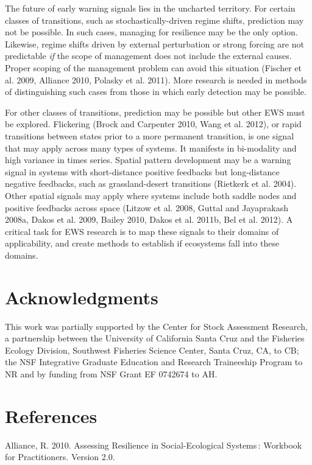 \documentclass{article}
\begin{document}
The future of early warning signals lies in the uncharted territory. For
certain classes of transitions, such as stochastically-driven regime
shifts, prediction may not be possible. In such cases, managing for
resilience may be the only option. Likewise, regime shifts driven by
external perturbation or strong forcing are not predictable \emph{if}
the scope of management does not include the external causes. Proper
scoping of the management problem can avoid this situation (Fischer et
al. 2009, Alliance 2010, Polasky et al. 2011). More research is needed
in methods of distinguishing such cases from those in which early
detection may be possible.

For other classes of transitions, prediction may be possible but other
EWS must be explored. Flickering (Brock and Carpenter 2010, Wang et al.
2012), or rapid transitions between states prior to a more permanent
transition, is one signal that may apply across many types of systems.
It manifests in bi-modality and high variance in times series. Spatial
pattern development may be a warning signal in systems with
short-distance positive feedbacks but long-distance negative feedbacks,
such as grassland-desert transitions (Rietkerk et al. 2004). Other
spatial signals may apply where systems include both saddle nodes and
positive feedbacks across space (Litzow et al. 2008, Guttal and
Jayaprakash 2008a, Dakos et al. 2009, Bailey 2010, Dakos et al. 2011b,
Bel et al. 2012). A critical task for EWS research is to map these
signals to their domains of applicability, and create methods to
establish if ecosystems fall into these domains.

\section{Acknowledgments}

This work was partially supported by the Center for Stock Assessment
Research, a partnership between the University of California Santa Cruz
and the Fisheries Ecology Division, Southwest Fisheries Science Center,
Santa Cruz, CA, to CB; the NSF Integrative Graduate Education and
Research Traineeship Program to NR and by funding from NSF Grant EF
0742674 to AH.

\section{References}

Alliance, R. 2010. Assessing Resilience in Social-Ecological Systems :
Workbook for Practitioners. Version 2.0.
\end{document}

